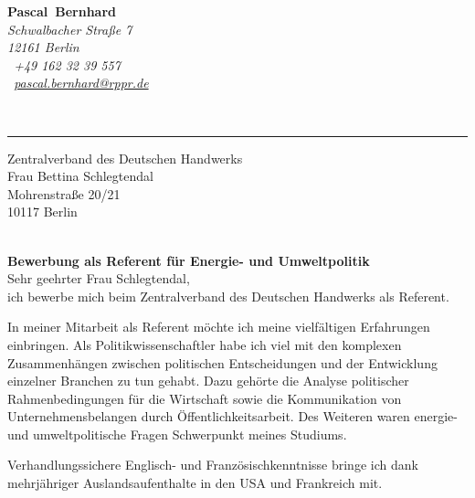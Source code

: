 \documentclass[11pt,a4paper]{article}
\def\firstname{Pascal}
\def\familyname{Bernhard}
\begin{document}
\sffamily   %
\hfill%
\begin{minipage}[t]{.6\textwidth}
	\raggedleft%
	{\bfseries {\color{firstnamecolor}\firstname}~{\color{familynamecolor}\familyname}}\\[.35ex]
	\small\itshape%
	Schwalbacher Straße 7\\
	12161 Berlin\\[.35ex]
	\Mobilefone~+49 162 32 39 557 \\
	\Letter~\href{mailto:pascal.bernhard@rppr.de}{pascal.bernhard@rppr.de}
\end{minipage}\\[0.5em]
%
{\color{firstnamecolor}\rule{\textwidth}{.25ex}}
%
\begin{minipage}[t]{.4\textwidth}
	\raggedright%
	\vspace*{1em}
	Zentralverband des Deutschen Handwerks \\
	Frau Bettina Schlegtendal \\[.35ex]
	\small%
	Mohrenstraße 20/21\\
	10117 Berlin
\end{minipage}
%
\hfill
%
\begin{minipage}[t]{.4\textwidth}
	\raggedleft %
\end{minipage}\\[1em]


{\bfseries \color{familynamecolor}Bewerbung als Referent für Energie- und Umweltpolitik}\\[0.75em]

Sehr geehrter Frau Schlegtendal,\\[0.5em]
%
ich bewerbe mich beim Zentralverband des Deutschen Handwerks als Referent.

In meiner Mitarbeit als Referent möchte ich meine vielfältigen Erfahrungen einbringen. Als Politikwissenschaftler habe ich viel mit den komplexen Zusammen­hängen zwischen politischen Entscheidungen und der Entwicklung einzelner Branchen zu tun gehabt. Dazu gehörte die Analyse politischer Rahmenbedingungen für die Wirtschaft sowie die Kommunikation von Unternehmensbelangen durch Öffentlichkeitsarbeit. Des Weiteren waren energie- und umweltpolitische Fragen Schwerpunkt meines Studiums.

Verhandlungssichere Englisch- und Französischkenntnisse bringe ich dank mehrjähriger Auslandsaufenthalte in den USA und Frankreich mit.
\end{document}
